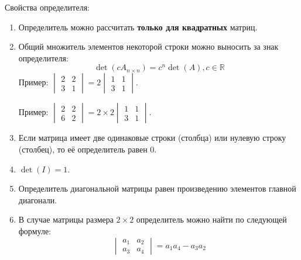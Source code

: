 \documentclass[11pt, a4paper]{extarticle}
\def \R{\mathbb{R}}
\begin{document}
Свойства определителя:
\begin{enumerate}
	\item Определитель можно рассчитать \textbf{только для квадратных} матриц.
	\item Общий множитель элементов некоторой строки можно выносить за знак определителя:
	\[
	\det(cA_{n\times n}) = c^n\det(A), c \in \R
	\]
	Пример: $\begin{vmatrix}
	2 & 2 \\
	3 & 1
	\end{vmatrix} = 2 \begin{vmatrix}
	1 & 1 \\
	3 & 1
	\end{vmatrix}$.
	
	Пример: $\begin{vmatrix}
	2 & 2 \\
	6 & 2
	\end{vmatrix} = 2 \times 2\begin{vmatrix}
	1 & 1 \\
	3 & 1
	\end{vmatrix}$.
	\item Если матрица имеет две одинаковые строки (столбца) или нулевую строку (столбец), то её определитель равен 0.
	\item $\det(I) = 1$.
	\item Определитель диагональной матрицы равен произведению элементов главной диагонали. 
	\item В случае матрицы размера $2\times2$ определитель можно найти по следующей формуле:
	\[
	\begin{vmatrix}
	a_1 & a_2 \\
	a_3 & a_4
	\end{vmatrix} =a_1a_4 - a_3a_2
	\]
\end{enumerate}
\end{document}
